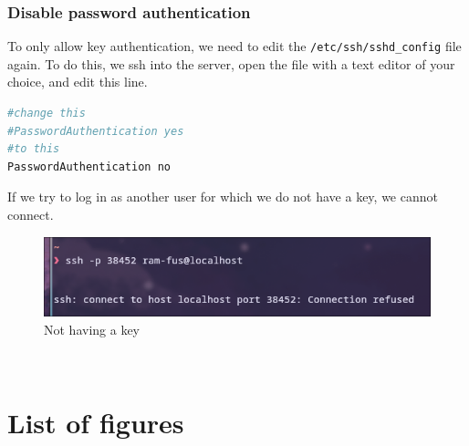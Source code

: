 \documentclass[a4paper]{article}
\begin{document}
\subsubsection{Disable password authentication}
To only allow key authentication, we need to edit the \texttt{/etc/ssh/sshd\_config} file again.
To do this, we ssh into the server, open the file with a text editor of your choice, and edit this line.
\begin{lstlisting}[language=bash]
#change this
#PasswordAuthentication yes
#to this
PasswordAuthentication no
\end{lstlisting}
If we try to log in as another user for which we do not have a key, we cannot connect.
\begin{figure}[h]
	\centering
	\includegraphics[scale=0.35]{images/nokey.png}
	\caption{Not having a key}
\end{figure} \\
\newpage

\newpage
\section{List of figures}

\listoffigures
\newpage
\end{document}
